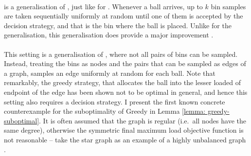 \paragraph{\KThinning}

\KThinning is a generalisation of \TwoThinning, just like \KChoice for \TwoChoice. Whenever a ball arrives, up to $k$ bin samples are taken sequentially uniformly at random until one of them is accepted by the decision strategy, and that is the bin where the ball is placed. Unlike for the \KChoice generalisation, this generalisation does provide a major improvement \cite{feldheim2020dthinning} \cite{los2021quantilethreshold}.


\paragraph{\GraphicalTwoChoice}

This setting is a generalisation of \TwoChoice, where not all pairs of bins can be sampled. Instead, treating the bins as nodes and the pairs that can be sampled as edges of a graph, \GraphicalTwoChoice samples an edge uniformly at random for each ball. Note that remarkably, the greedy strategy, that allocates the ball into the lesser loaded of endpoint of the edge has been shown not to be optimal in general, and hence this setting also requires a decision strategy. I present the first known concrete counterexample for the suboptimality of Greedy in Lemma \ref{lemma: greedy-suboptimal}. It is often assumed that the graph is regular (i.e.\ all nodes have the same degree), otherwise the symmetric final maximum load objective function is not reasonable -- take the star graph as an example of a highly unbalanced graph  .

